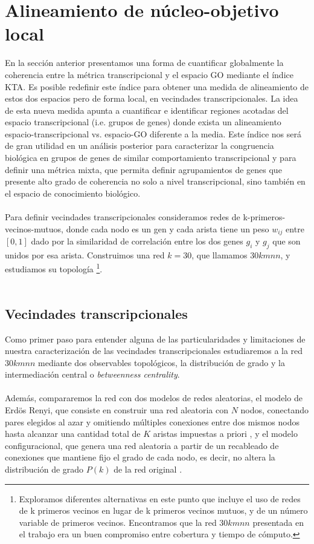 \section{Alineamiento de núcleo-objetivo local}
En la sección anterior presentamos una forma de cuantificar globalmente la coherencia entre la métrica transcripcional y el espacio GO mediante el índice KTA. Es posible redefinir este índice para obtener una medida de alineamiento de estos dos espacios pero de forma local, en vecindades transcripcionales. La idea de esta nueva medida apunta a cuantificar e identificar regiones acotadas del espacio transcripcional (i.e. grupos de genes) donde exista un alineamiento espacio-transcripcional vs. espacio-GO diferente a la media. Este índice nos será de gran utilidad en un análisis posterior para caracterizar la congruencia biológica en grupos de genes de similar comportamiento transcripcional y para definir una métrica mixta, que permita definir agrupamientos de genes que presente alto grado de coherencia no solo a nivel transcripcional, sino también en el espacio de conocimiento biológico.\\\\
Para definir vecindades transcripcionales consideramos redes de k-primeros-vecinos-mutuos, donde cada nodo es un gen y cada arista tiene un peso $w_{ij}$ entre $[0, 1]$ dado por la similaridad de correlación entre los dos genes $g_i$ y $g_j$ que son unidos por esa arista. Construimos una red $k=30$, que llamamos $30kmnn$, y estudiamos su topología \footnote{Exploramos diferentes alternativas en este punto que incluye el uso de redes de k primeros vecinos en lugar de k primeros vecinos mutuos, y de un número variable de primeros vecinos. Encontramos que la red $30kmnn$ presentada en el trabajo era un buen compromiso entre cobertura y tiempo de cómputo.}.\\\\
\subsection{Vecindades transcripcionales}
Como primer paso para entender alguna de las particularidades y limitaciones de nuestra caracterización de las vecindades transcripcionales estudiaremos a la red $30kmnn$ mediante dos observables topológicos, la distribución de grado y la intermediación central o \textit{betweenness centrality}.\\\\
Además, compararemos la red con dos modelos de redes aleatorias, el modelo de Erdös Renyi, que consiste en construir una red aleatoria con $N$ nodos, conectando pares elegidos al azar y omitiendo múltiples conexiones entre dos mismos nodos hasta alcanzar una cantidad total de $K$ aristas impuestas a priori \cite{Erdos1959}, y el modelo configuracional, que genera una red aleatoria a partir de un recableado de conexiones que mantiene fijo el grado de cada nodo, es decir, no altera la distribución de grado $P(k)$ de la red original \cite{Molloy1995}.
